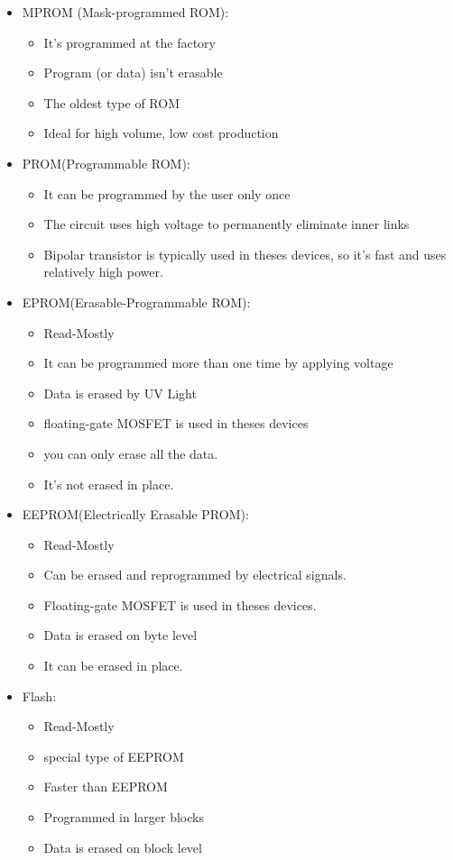 \documentclass[12 pt]{article}
\begin{document}
\begin{itemize}
    \item MPROM (Mask-programmed ROM): \begin{itemize}
        \item It's programmed at the factory
        \item Program (or data) isn't erasable
        \item The oldest type of ROM
        \item Ideal for high volume, low cost production
    \end{itemize}
    \item PROM(Programmable ROM):\begin{itemize}
        \item It can be programmed by the user only once
        \item The circuit uses high voltage to permanently eliminate inner links
        \item Bipolar transistor is typically used in theses devices, so it's fast and uses relatively high power.
    \end{itemize}
    \item EPROM(Erasable-Programmable ROM): \begin{itemize}
        \item Read-Mostly
        \item It can be programmed more than one time by applying voltage
        \item Data is erased by UV Light
        \item floating-gate MOSFET  is used in theses devices
        \item you can only erase all the data.
        \item It's not erased in place.
    \end{itemize}
    \item EEPROM(Electrically Erasable PROM):\begin{itemize}
        \item Read-Mostly
        \item Can be erased and reprogrammed by electrical signals.
        \item Floating-gate MOSFET is used in theses devices.
        \item Data is erased on byte level
        \item It can be erased in place.
    \end{itemize}
    \item Flash: \begin{itemize}
        \item Read-Mostly
        \item special type of EEPROM
        \item Faster than EEPROM
        \item Programmed in larger blocks
        \item Data is erased on block level
    \end{itemize}
\end{itemize}
\end{document}
